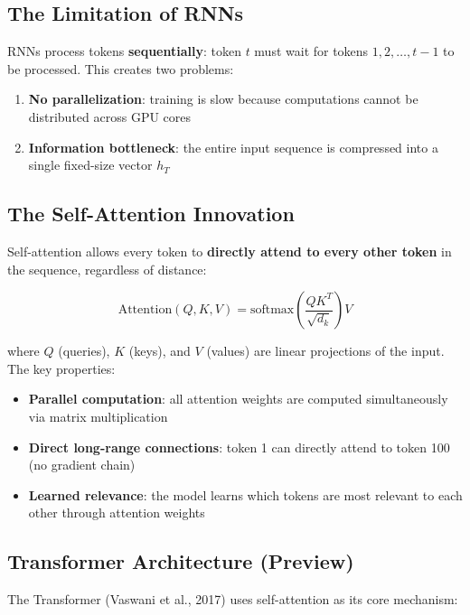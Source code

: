 \documentclass[11pt,a4paper]{article}
\begin{document}
\subsection{The Limitation of RNNs}

RNNs process tokens \textbf{sequentially}: token $t$ must wait for tokens $1, 2, \ldots, t{-}1$ to be processed. This creates two problems:
\begin{enumerate}[leftmargin=1.5em]
    \item \textbf{No parallelization}: training is slow because computations cannot be distributed across GPU cores
    \item \textbf{Information bottleneck}: the entire input sequence is compressed into a single fixed-size vector $h_T$
\end{enumerate}

\subsection{The Self-Attention Innovation}

Self-attention allows every token to \textbf{directly attend to every other token} in the sequence, regardless of distance:

\begin{equation}
\text{Attention}(Q, K, V) = \text{softmax}\!\left(\frac{QK^T}{\sqrt{d_k}}\right) V
\end{equation}

where $Q$ (queries), $K$ (keys), and $V$ (values) are linear projections of the input. The key properties:

\begin{itemize}[leftmargin=1.5em]
    \item \textbf{Parallel computation}: all attention weights are computed simultaneously via matrix multiplication
    \item \textbf{Direct long-range connections}: token 1 can directly attend to token 100 (no gradient chain)
    \item \textbf{Learned relevance}: the model learns which tokens are most relevant to each other through attention weights
\end{itemize}

\subsection{Transformer Architecture (Preview)}

The Transformer (Vaswani et al., 2017) uses self-attention as its core mechanism:
\end{document}
